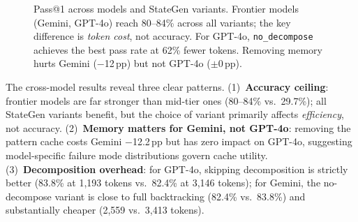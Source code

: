 \documentclass[11pt,twocolumn]{article}
\begin{document}
\begin{figure}[H]
\centering
{}
\caption{Pass@1 across models and StateGen variants. Frontier models (Gemini,
GPT-4o) reach 80--84\% across all variants; the key difference is
\emph{token cost}, not accuracy. For GPT-4o, \texttt{no\_decompose} achieves
the best pass rate at 62\% fewer tokens. Removing memory hurts Gemini ($-$12\,pp)
but not GPT-4o ($\pm$0\,pp).}
\label{fig:crossmodel}
\end{figure}

The cross-model results reveal three clear patterns.
(1)~\textbf{Accuracy ceiling}: frontier models are far stronger than mid-tier
ones (80--84\% vs.\ 29.7\%); all StateGen variants benefit, but the choice of
variant primarily affects \emph{efficiency}, not accuracy.
(2)~\textbf{Memory matters for Gemini, not GPT-4o}: removing the pattern cache
costs Gemini $-$12.2\,pp but has zero impact on GPT-4o, suggesting model-specific
failure mode distributions govern cache utility.
(3)~\textbf{Decomposition overhead}: for GPT-4o, skipping decomposition is
strictly better (83.8\% at 1,193 tokens vs.\ 82.4\% at 3,146 tokens);
for Gemini, the no-decompose variant is close to full backtracking (82.4\%
vs.\ 83.8\%) and substantially cheaper (2,559 vs.\ 3,413 tokens).
\end{document}
